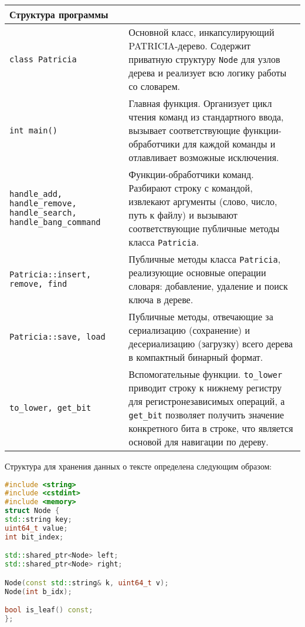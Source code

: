 \begin{longtable}{|p{6cm}|p{9cm}|}
\hline
\rowcolor{lightgray}
\multicolumn{2}{|c|} {Структура программы}\\
\hline
\texttt{class Patricia} & Основной класс, инкапсулирующий PATRICIA-дерево. Содержит приватную структуру \texttt{Node} для узлов дерева и реализует всю логику работы со словарем. \\
\hline
\texttt{int main()} & Главная функция. Организует цикл чтения команд из стандартного ввода, вызывает соответствующие функции-обработчики для каждой команды и отлавливает возможные исключения. \\
\hline
\texttt{handle\_add, handle\_remove, handle\_search, handle\_bang\_command} & Функции-обработчики команд. Разбирают строку с командой, извлекают аргументы (слово, число, путь к файлу) и вызывают соответствующие публичные методы класса \texttt{Patricia}. \\
\hline
\texttt{Patricia::insert, remove, find} & Публичные методы класса \texttt{Patricia}, реализующие основные операции словаря: добавление, удаление и поиск ключа в дереве. \\
\hline
\texttt{Patricia::save, load} & Публичные методы, отвечающие за сериализацию (сохранение) и десериализацию (загрузку) всего дерева в компактный бинарный формат. \\
\hline
\texttt{to\_lower, get\_bit} & Вспомогательные функции. \texttt{to\_lower} приводит строку к нижнему регистру для регистронезависимых операций, а \texttt{get\_bit} позволяет получить значение конкретного бита в строке, что является основой для навигации по дереву. \\
\hline
\end{longtable}

\pagebreak

Структура для хранения данных о тексте определена следующим образом:
\begin{lstlisting}[language=C++]
#include <string>
#include <cstdint>
#include <memory>
struct Node {
std::string key;
uint64_t value;
int bit_index;

std::shared_ptr<Node> left;
std::shared_ptr<Node> right;

Node(const std::string& k, uint64_t v);
Node(int b_idx);

bool is_leaf() const;
};
\end{lstlisting}
\pagebreak


